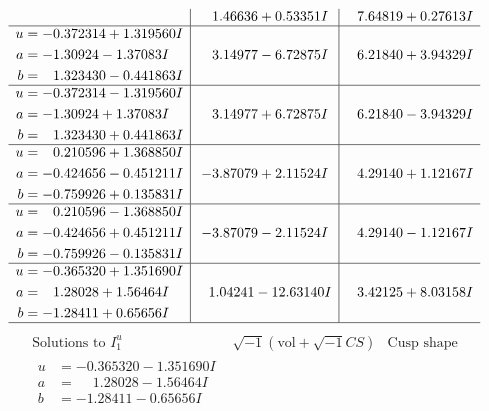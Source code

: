 \documentclass[1p]{elsarticle_modified}
\theoremstyle{definition}
\newcommand{\I}{\sqrt{-1}}
\begin{document}
$$\begin{array}{c|c|c}
 & \phantom{-}1.46636 + 0.53351 I & \phantom{-}7.64819 + 0.27613 I \\ \hline\begin{aligned}
u &= -0.372314 + 1.319560 I \\
a &= -1.30924 - 1.37083 I \\
b &= \phantom{-}1.323430 - 0.441863 I\end{aligned}
 & \phantom{-}3.14977 - 6.72875 I & \phantom{-}6.21840 + 3.94329 I \\ \hline\begin{aligned}
u &= -0.372314 - 1.319560 I \\
a &= -1.30924 + 1.37083 I \\
b &= \phantom{-}1.323430 + 0.441863 I\end{aligned}
 & \phantom{-}3.14977 + 6.72875 I & \phantom{-}6.21840 - 3.94329 I \\ \hline\begin{aligned}
u &= \phantom{-}0.210596 + 1.368850 I \\
a &= -0.424656 - 0.451211 I \\
b &= -0.759926 + 0.135831 I\end{aligned}
 & -3.87079 + 2.11524 I & \phantom{-}4.29140 + 1.12167 I \\ \hline\begin{aligned}
u &= \phantom{-}0.210596 - 1.368850 I \\
a &= -0.424656 + 0.451211 I \\
b &= -0.759926 - 0.135831 I\end{aligned}
 & -3.87079 - 2.11524 I & \phantom{-}4.29140 - 1.12167 I \\ \hline\begin{aligned}
u &= -0.365320 + 1.351690 I \\
a &= \phantom{-}1.28028 + 1.56464 I \\
b &= -1.28411 + 0.65656 I\end{aligned}
 & \phantom{-}1.04241 - 12.63140 I & \phantom{-}3.42125 + 8.03158 I\\
 \hline 
 \end{array}$$\newpage$$\begin{array}{c|c|c}  
\text{Solutions to }I^u_{1}& \I (\text{vol} + \sqrt{-1}CS) & \text{Cusp shape}\\
 \hline 
\begin{aligned}
u &= -0.365320 - 1.351690 I \\
a &= \phantom{-}1.28028 - 1.56464 I \\
b &= -1.28411 - 0.65656 I\end{aligned}

\end{array}$$
\end{document}
